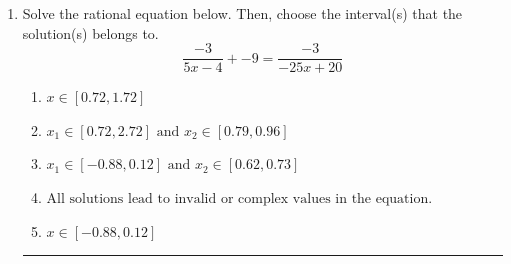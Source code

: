 \documentclass[14pt]{extbook}
\newcommand{\litem}[1]{\item#1\hspace*{-1cm}\rule{\textwidth}{0.4pt}}
\begin{document}
\begin{enumerate}
{\begin{enumerate}[label=\Alph*.]
\end{enumerate} }
\litem{
Solve the rational equation below. Then, choose the interval(s) that the solution(s) belongs to.\[ \frac{-3}{5x -4} + -9 = \frac{-3}{-25x + 20} \]\begin{enumerate}[label=\Alph*.]
\item \( x \in [0.72,1.72] \)
\item \( x_1 \in [0.72, 2.72] \text{ and } x_2 \in [0.79,0.96] \)
\item \( x_1 \in [-0.88, 0.12] \text{ and } x_2 \in [0.62,0.73] \)
\item \( \text{All solutions lead to invalid or complex values in the equation.} \)
\item \( x \in [-0.88,0.12] \)

\end{enumerate} }
\end{enumerate}
\end{document}
